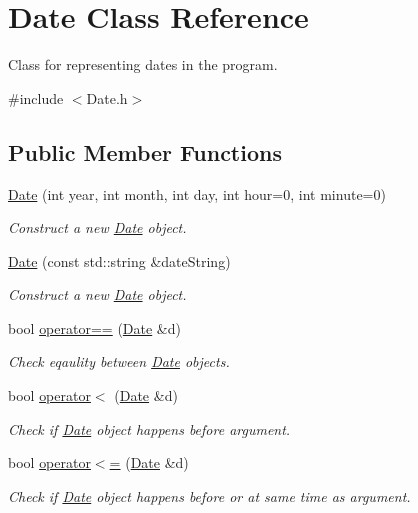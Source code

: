 \hypertarget{classDate}{}\section{Date Class Reference}
\label{classDate}


Class for representing dates in the program.  




{\ttfamily \#include $<$Date.\+h$>$}

\subsection*{Public Member Functions}
\begin{DoxyCompactItemize}
\item 
\mbox{\hyperlink{classDate_aa29ee0f04162437b91b758be0a4b75fc}{Date}} (int year, int month, int day, int hour=0, int minute=0)
\begin{DoxyCompactList}\small\item\em Construct a new \mbox{\hyperlink{classDate}{Date}} object. \end{DoxyCompactList}\item 
\mbox{\hyperlink{classDate_abaa8b0cf93eb1ad9206be4ff78ed2a3b}{Date}} (const std\+::string \&date\+String)
\begin{DoxyCompactList}\small\item\em Construct a new \mbox{\hyperlink{classDate}{Date}} object. \end{DoxyCompactList}\item 
bool \mbox{\hyperlink{classDate_a91ccc0361527f5f68785c5460d750a12}{operator==}} (\mbox{\hyperlink{classDate}{Date}} \&d)
\begin{DoxyCompactList}\small\item\em Check eqaulity between \mbox{\hyperlink{classDate}{Date}} objects. \end{DoxyCompactList}\item 
bool \mbox{\hyperlink{classDate_a51d1dadde23783adc9a2ae12d877803c}{operator$<$}} (\mbox{\hyperlink{classDate}{Date}} \&d)
\begin{DoxyCompactList}\small\item\em Check if \mbox{\hyperlink{classDate}{Date}} object happens before argument. \end{DoxyCompactList}\item 
bool \mbox{\hyperlink{classDate_a49b4e0ed6752c928164fd483720423da}{operator$<$=}} (\mbox{\hyperlink{classDate}{Date}} \&d)
\begin{DoxyCompactList}\small\item\em Check if \mbox{\hyperlink{classDate}{Date}} object happens before or at same time as argument. \end{DoxyCompactList}\item 

\end{DoxyCompactItemize}
